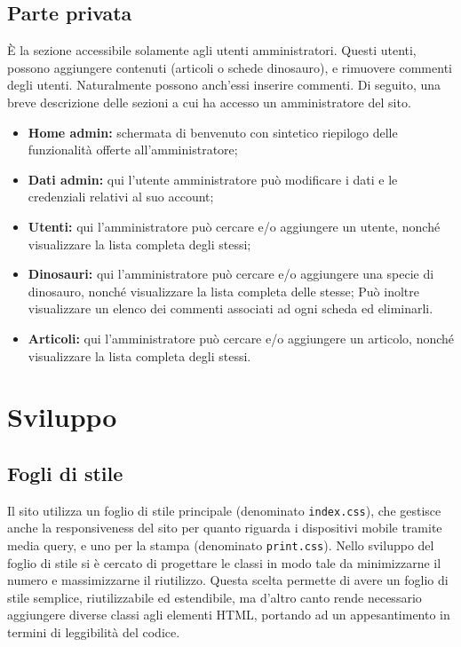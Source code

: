 \documentclass[12pt]{article}
\newcommand{\code}[1]{\texttt{#1}}
\begin{document}
	\subsection{Parte privata}

	È la sezione accessibile solamente agli utenti amministratori. Questi utenti, possono aggiungere contenuti (articoli o schede dinosauro), e rimuovere commenti degli utenti. Naturalmente possono anch'essi inserire commenti.
	Di seguito, una breve descrizione delle sezioni a cui ha accesso un amministratore del sito.
	
	\begin{itemize}
		\item \textbf{Home admin:} schermata di benvenuto con sintetico riepilogo delle funzionalità offerte all'amministratore;
		
		\item \textbf{Dati admin:} qui l'utente amministratore può modificare i dati e le credenziali relativi al suo account;
		
		\item \textbf{Utenti:} qui l'amministratore può cercare e/o aggiungere un utente, nonché visualizzare la lista completa degli stessi;
		
		\item \textbf{Dinosauri:} qui l'amministratore può cercare e/o aggiungere una specie di dinosauro, nonché visualizzare la lista completa delle stesse; Può inoltre visualizzare un elenco dei commenti associati ad ogni scheda ed eliminarli.
		
		\item \textbf{Articoli:} qui l'amministratore può cercare e/o aggiungere un articolo, nonché visualizzare la lista completa degli stessi.
	\end{itemize}
	
	\section{Sviluppo}
	
	\subsection{Fogli di stile}
	
	Il sito utilizza un foglio di stile principale (denominato \code{index.css}), che gestisce anche la responsiveness del sito per quanto riguarda i dispositivi mobile tramite media query, e uno per la stampa (denominato \code{print.css}). Nello sviluppo del foglio di stile si è cercato di progettare le classi in modo tale da minimizzarne il numero e massimizzarne il riutilizzo. Questa scelta permette di avere un foglio di stile semplice, riutilizzabile ed estendibile, ma d'altro canto rende necessario aggiungere diverse classi agli elementi HTML, portando ad un appesantimento in termini di leggibilità del codice.
	
\end{document}

